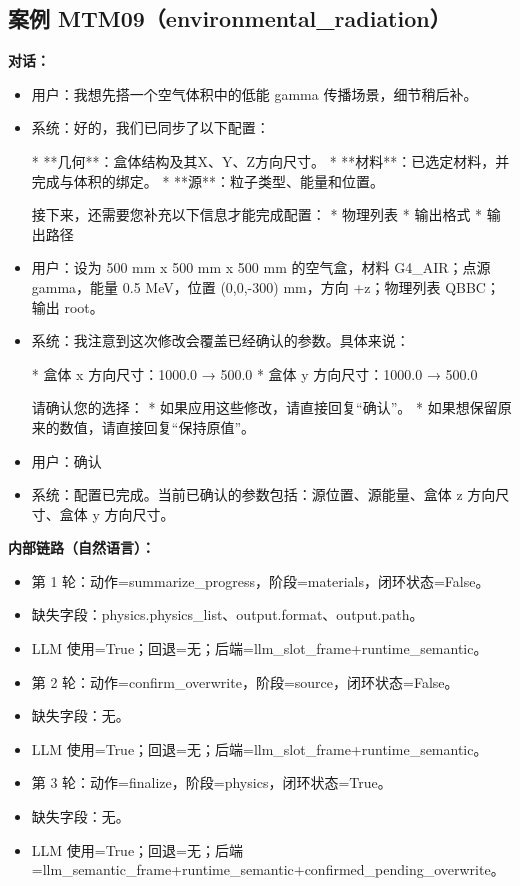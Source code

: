 \documentclass[11pt]{ctexart}
\begin{document}
\subsection{案例 MTM09（environmental\_radiation）}
\textbf{对话：}
\begin{itemize}
\item 用户：我想先搭一个空气体积中的低能 gamma 传播场景，细节稍后补。
\item 系统：好的，我们已同步了以下配置：

*   **几何**：盒体结构及其X、Y、Z方向尺寸。
*   **材料**：已选定材料，并完成与体积的绑定。
*   **源**：粒子类型、能量和位置。

接下来，还需要您补充以下信息才能完成配置：
*   物理列表
*   输出格式
*   输出路径
\item 用户：设为 500 mm x 500 mm x 500 mm 的空气盒，材料 G4\_AIR；点源 gamma，能量 0.5 MeV，位置 (0,0,-300) mm，方向 +z；物理列表 QBBC；输出 root。
\item 系统：我注意到这次修改会覆盖已经确认的参数。具体来说：

*   盒体 x 方向尺寸：1000.0 → 500.0
*   盒体 y 方向尺寸：1000.0 → 500.0

请确认您的选择：
*   如果应用这些修改，请直接回复“确认”。
*   如果想保留原来的数值，请直接回复“保持原值”。
\item 用户：确认
\item 系统：配置已完成。当前已确认的参数包括：源位置、源能量、盒体 z 方向尺寸、盒体 y 方向尺寸。
\end{itemize}
\textbf{内部链路（自然语言）：}
\begin{itemize}
\item 第 1 轮：动作=summarize\_progress，阶段=materials，闭环状态=False。
\item 缺失字段：physics.physics\_list、output.format、output.path。
\item LLM 使用=True；回退=无；后端=llm\_slot\_frame+runtime\_semantic。
\item 第 2 轮：动作=confirm\_overwrite，阶段=source，闭环状态=False。
\item 缺失字段：无。
\item LLM 使用=True；回退=无；后端=llm\_slot\_frame+runtime\_semantic。
\item 第 3 轮：动作=finalize，阶段=physics，闭环状态=True。
\item 缺失字段：无。
\item LLM 使用=True；回退=无；后端=llm\_semantic\_frame+runtime\_semantic+confirmed\_pending\_overwrite。
\end{itemize}
\end{document}
